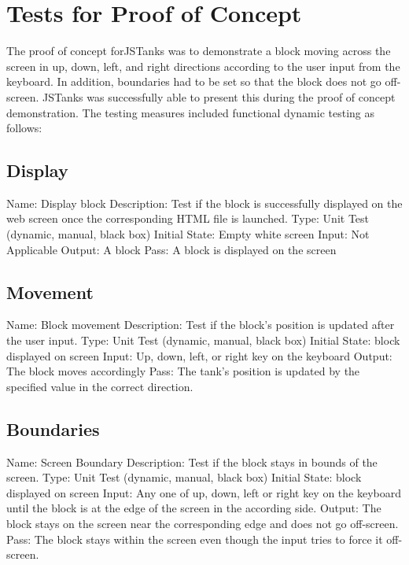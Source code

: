 \documentclass{article}
\begin{document}
\section{Tests for Proof of Concept}
The proof of concept forJSTanks was to demonstrate a block moving across the 
screen in up, down, left, and right directions according to the user input 
from the keyboard. In addition, boundaries had to be set so that the block 
does not go off-screen. JSTanks was successfully able to present this during 
the proof of concept demonstration. The testing measures included functional 
dynamic testing as follows:
\subsection{Display}
Name: Display block\newline
Description: Test if the block is successfully displayed on the web screen 
once the corresponding HTML file is launched.\newline
Type: Unit Test (dynamic, manual, black box)\newline
Initial State: Empty white screen\newline
Input: Not Applicable\newline
Output: A block\newline
Pass: A block is displayed on the screen
\subsection{Movement}
Name: Block movement\newline
Description: Test if the block’s position is updated after the user input.
\newline
Type: Unit Test (dynamic, manual, black box)\newline
Initial State: block displayed on screen\newline
Input: Up, down, left, or right key on the keyboard\newline
Output: The block moves accordingly\newline
Pass: The tank’s position is updated by the specified value in the correct 
direction.
\subsection{Boundaries}
Name: Screen Boundary\newline
Description: Test if the block stays in bounds of the screen.\newline
Type: Unit Test (dynamic, manual, black box)\newline
Initial State: block displayed on screen\newline
Input: Any one of up, down, left or right key on the keyboard until the block 
is at the edge of the screen in the according side.\newline
Output: The block stays on the screen near the corresponding edge and does not 
go off-screen.\newline
Pass: The block stays within the screen even though the input tries to force 
it off-screen.
\end{document}
